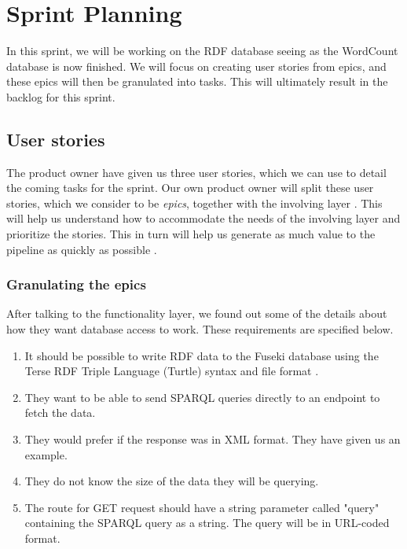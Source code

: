 \section{Sprint Planning}
In this sprint, we will be working on the RDF database seeing as the WordCount database is now finished.
We will focus on creating user stories from epics, and these epics will then be granulated into tasks.
This will ultimately result in the backlog for this sprint.

\subsection*{User stories}\label{sec:userstories5}
The \knox{} product owner have given us three user stories, which we can use to detail the coming tasks for the sprint.
Our own product owner will split these user stories, which we consider to be \textit{epics}, together with the involving layer \cite{Epics}.
This will help us understand how to accommodate the needs of the involving layer and prioritize the stories.
This in turn will help us generate as much value to the pipeline as quickly as possible \cite{UserStories}.


\subsubsection*{Granulating the epics}
After talking to the functionality layer, we found out some of the details about how they want database access to work. These requirements are specified below.

\begin{enumerate}
    \item It should be possible to write RDF data to the Fuseki database using the Terse RDF Triple Language (Turtle) syntax and file format \cite{TurtleFormat}.
    \item They want to be able to send SPARQL queries directly to an endpoint to fetch the data.
    \item They would prefer if the response was in XML format. They have given us an example.
    \item They do not know the size of the data they will be querying.
    \item The route for GET request should have a string parameter called "query" containing the SPARQL query as a string.
    The query will be in URL-coded format.
\end{enumerate}

